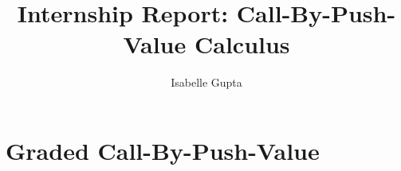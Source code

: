 \documentclass[acmsmall,screen,nonacm]{acmart}
\begin{document}
\title{Internship Report: Call-By-Push-Value Calculus}

\author{Isabelle Gupta}








\maketitle

\section{Graded Call-By-Push-Value}
\end{document}
